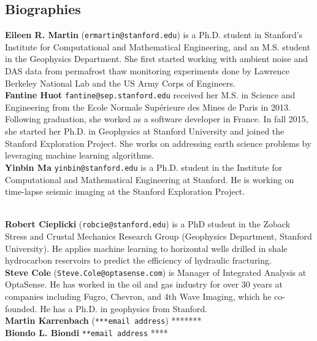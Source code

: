 \documentclass[11pt]{article}
\begin{document}
\subsection*{Biographies}
\vspace{-0.2cm}
\textbf{Eileen R. Martin} (\texttt{ermartin@stanford.edu}) is a Ph.D. student in Stanford's Institute for Computational and Mathematical Engineering, and an M.S. student in the Geophysics Department. She first started working with ambient noise and DAS data from permafrost thaw monitoring experiments done by Lawrence Berkeley National Lab and the US Army Corps of Engineers.
\\
\textbf{Fantine Huot} \texttt{fantine@sep.stanford.edu} received her M.S. in Science and Engineering from the Ecole Normale Sup\'erieure des Mines de Paris in 2013. Following graduation, she worked as a software developer in France. In fall 2015, she started her Ph.D. in Geophysics at Stanford University and joined the Stanford Exploration Project. She works on addressing earth science problems by leveraging machine learning algorithms.
\\
\textbf{Yinbin Ma} \texttt{yinbin@stanford.edu} is a Ph.D. student in the Institute for Computational and Mathematical Engineering at Stanford. He is working on time-lapse seismic imaging at the Stanford Exploration Project.

\\
\textbf{Robert Cieplicki} (\texttt{robcie@stanford.edu}) is a PhD student in the Zoback Stress and Crustal Mechanics Research Group (Geophysics Department, Stanford University). He applies machine learning to horizontal wells drilled in shale hydrocarbon reservoirs to predict the efficiency of hydraulic fracturing.
\\
\textbf{Steve Cole} (\texttt{Steve.Cole@optasense.com}) is Manager of Integrated Analysis at OptaSense. He has worked in the oil and gas industry for over 30 years at companies including Fugro, Chevron, and 4th Wave Imaging, which he co-founded. He has a Ph.D. in geophysics from Stanford.
\\
\textbf{Martin Karrenbach} (\texttt{***email address}) *******
\\
\textbf{Biondo L. Biondi} \texttt{**email address} ****
\end{document}
